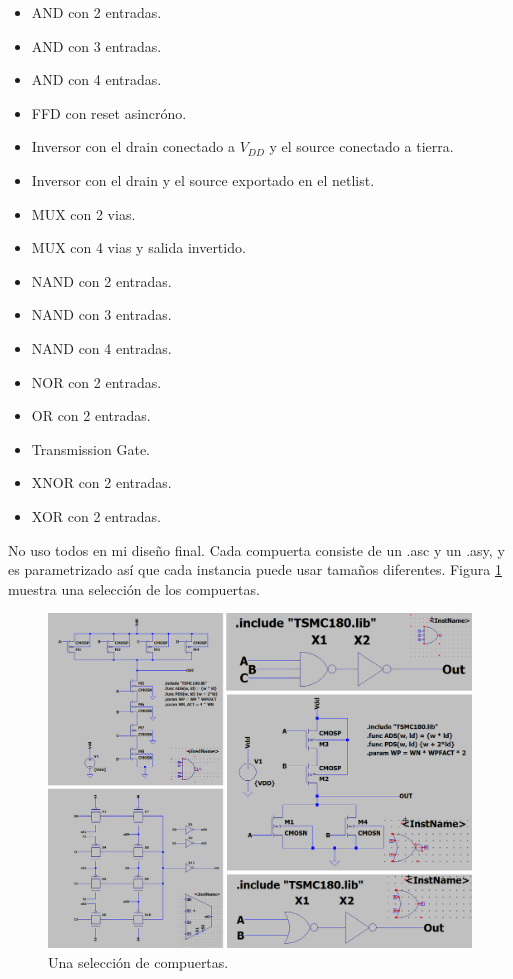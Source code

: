 \documentclass[a4paper]{article}
\begin{document}
\begin{itemize}[noitemsep]
    \item AND con 2 entradas.
    \item AND con 3 entradas.
    \item AND con 4 entradas.
    \item FFD con reset asincróno.
    \item Inversor con el drain conectado a $V_{DD}$ y el source conectado a tierra.
    \item Inversor con el drain y el source exportado en el netlist.
    \item MUX con 2 vias.
    \item MUX con 4 vias y salida invertido.
    \item NAND con 2 entradas.
    \item NAND con 3 entradas.
    \item NAND con 4 entradas.
    \item NOR con 2 entradas.
    \item OR con 2 entradas.
    \item Transmission Gate.
    \item XNOR con 2 entradas.
    \item XOR con 2 entradas.
\end{itemize}

No uso todos en mi diseño final. Cada compuerta consiste de un .asc y un .asy, y es parametrizado así que cada instancia puede usar tamaños diferentes. Figura \ref{fig:compuertas_sch} muestra una selección de los compuertas.

\begin{figure}[!htb]
\centering
\includegraphics[scale=0.4]{./img/compuertas_sch}
\caption{Una selección de compuertas.}
\label{fig:compuertas_sch}
\end{figure}
\end{document}
